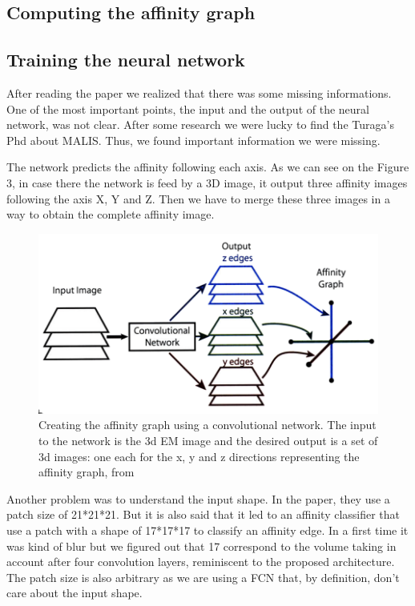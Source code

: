 \subsection{Computing the affinity graph}
\subsection{Training the neural network}

After reading the paper we realized that there was some missing informations. One of the most important points, the input and the output of the neural network, was not clear. After some research we were lucky to find the Turaga’s Phd about MALIS. Thus, we found important information we were missing.

The network predicts the affinity following each axis. As we can see on the Figure 3, in case there the network is feed by a 3D image, it output three affinity images following the axis X, Y and Z. Then we have to merge these three images in a way to obtain the complete affinity image.

\begin{figure}[!htbp]
	\centering
	\includegraphics[width=0.8\linewidth]{./images/nn_output.png}
	\caption{Creating the affinity graph using a convolutional network. The input to the network is the 3d EM image and the desired output is a set of 3d images: one each for the x, y and z directions representing the affinity graph, from~\cite{turaga_learning_2010}}%
	\label{fig:nn_output}
\end{figure}

Another problem was to understand the input shape. In the paper, they use a patch size of 21*21*21. But it is also said that it led to an affinity classifier that use a patch with a shape of 17*17*17 to classify an affinity edge. In a first time it was kind of blur but we figured out that 17 correspond to the volume taking in account after four convolution layers, reminiscent to the proposed architecture. The patch size is also arbitrary as we are using a FCN that, by definition, don’t care about the input shape.
\newpage


